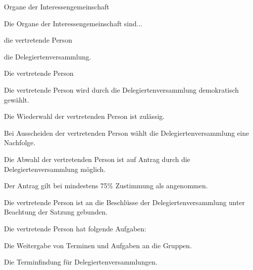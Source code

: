 \begin{legal}
    \item Organe der Interessengemeinschaft
        \begin{legal}
            \item Die Organe der Interessengemeinschaft sind...
                \begin{legal}
                    \item die vertretende Person
                    \item die Delegiertenversammlung.
                \end{legal}
        \end{legal}
    \item Die vertretende Person
        \begin{legal}
            \item Die vertretende Person wird durch die Delegiertenversammlung 
                  demokratisch gewählt.
            \item Die Wiederwahl der vertretenden Person ist zulässig.
            \item Bei Ausscheiden der vertretenden Person wählt die Delegiertenversammlung 
                  eine Nachfolge.
            \item Die Abwahl der vertretenden Person ist auf Antrag durch die 
                  Delegiertenversammlung möglich.
                \begin{legal}
                    \item Der Antrag gilt bei mindestens 75\% Zustimmung als angenommen.
                \end{legal}
            \item Die vertretende Person ist an die Beschlüsse der Delegiertenversammlung 
                  unter Beachtung der Satzung gebunden.
            \item Die vertretende Person hat folgende Aufgaben:
                  \begin{legal}
                        \item Die Weitergabe von Terminen und Aufgaben an die Gruppen.
                        \item Die Terminfindung für Delegiertenversammlungen.

\end{legal}
\end{legal}
\end{legal}
